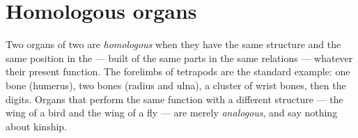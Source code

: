 \section{Homologous organs}

\begin{definition}[Homology]\label{def:g10:common-ancestry:homology}
Two organs of two  are \emph{homologous} when
they have the same structure and the same position in the 
--- built of the same parts in the same relations --- whatever their
present function. The forelimbs of tetrapods are the standard example:
one bone (humerus), two bones (radius and ulna), a cluster of wrist
bones, then the digits. Organs that perform the same function with a
different structure --- the wing of a bird and the wing of a fly --- are
merely \emph{analogous}, and say nothing about kinship.
\end{definition}

